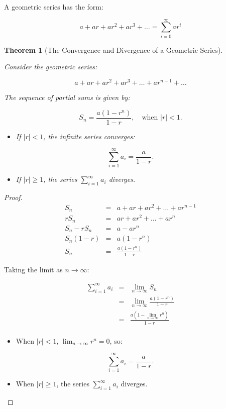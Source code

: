 \documentclass[
]{book}
\providecommand{\tightlist}{%
  \setlength{\itemsep}{0pt}\setlength{\parskip}{0pt}}
\newtheorem{theorem}{Theorem}[chapter]
\theoremstyle{definition}
\theoremstyle{definition}
\theoremstyle{definition}
\theoremstyle{definition}
\theoremstyle{remark}
\begin{document}
A geometric series has the form:

\[
a + ar + ar^2 + ar^3 + \dots = \sum_{i=0}^{\infty} ar^i
\]

\begin{theorem}[The Convergence and Divergence of a Geometric Series]
\protect\hypertarget{thm:unnamed-chunk-45}{}\label{thm:unnamed-chunk-45}

Consider the geometric series:

\[
a + ar + ar^2 + ar^3 + \dots + ar^{n-1} + \dots
\]

The sequence of partial sums is given by:

\[
S_n = \frac{a(1 - r^n)}{1 - r}, \quad \text{when } |r| < 1.
\]

\begin{itemize}
\tightlist
\item
  If \(|r| < 1\), the infinite series converges:
\end{itemize}

\[
\sum_{i=1}^\infty a_i = \frac{a}{1 - r}.
\]

\begin{itemize}
\tightlist
\item
  If \(|r| \geq 1\), the series \(\sum_{i=1}^\infty a_i\) diverges.
\end{itemize}

\end{theorem}

\begin{proof}

\begin{eqnarray}
S_n  &=& a + ar + ar^2 + \dots + ar^{n-1}\\
rS_n &=& ar + ar^2 + \dots + ar^n \\
S_n - rS_n &=& a - ar^n\\
S_n(1 - r) &=& a(1 - r^n)\\
S_n &=& \frac{a(1 - r^n)}{1 - r}
\end{eqnarray}

Taking the limit as \(n \to \infty\):

\begin{eqnarray}
\sum_{i=1}^\infty a_i 
&=& \lim_{n \to \infty} S_n\\
&=& \lim_{n \to \infty} \frac{a(1 - r^n)}{1 - r}\\
&=& \frac{a(1 - \lim_{n \to \infty} r^n)}{1 - r} \\
\end{eqnarray}

\begin{itemize}
\tightlist
\item
  When \(|r| < 1\), \(\lim_{n \to \infty} r^n = 0\), so:
\end{itemize}

\[
\sum_{i=1}^\infty a_i = \frac{a}{1 - r}.
\]

\begin{itemize}
\tightlist
\item
  When \(|r| \geq 1\), the series \(\sum_{i=1}^\infty a_i\) diverges.
\end{itemize}

\end{proof}
\end{document}

